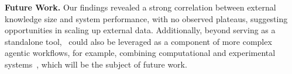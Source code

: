 \textbf{Future Work.}
Our findings revealed a strong correlation between external knowledge size and system performance, with no observed plateaus, suggesting opportunities in scaling up external data. Additionally, beyond serving as a standalone tool, \proposed~could also be leveraged as a component of more complex agentic workflows, for example, combining computational and experimental systems~\cite{tom2024self}, which will be the subject of future work.






% 